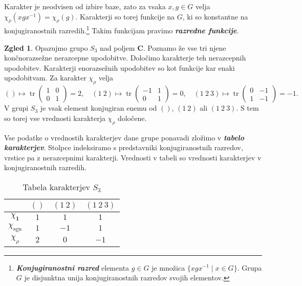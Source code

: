\documentclass[11pt]{book}
\def\CC{\mathbf{C}}
\def\11{\mathbf{1}}
\DeclareMathOperator\sgn{sgn}
\DeclareMathOperator\tr{tr}
\def\definicija{\color{rdeca}\bf\em}
\theoremstyle{definition}
\theoremstyle{zgled}
\newtheorem*{zgled}{Zgled}
\theoremstyle{odprtproblem}
\theoremstyle{domacanaloga}
\theoremstyle{izrek}
\begin{document}
Karakter je neodvisen od izbire baze, zato za vsaka $x, g \in G$ velja $\chi_{\rho}(x g x^{-1}) = \chi_{\rho}(g)$. Karakterji so torej funkcije na $G$, ki so konstantne na konjugiranostnih razredih.\footnote{{\definicija Konjugiranostni razred} elementa $g \in G$ je množica $\{ x g x^{-1} \mid x \in G \}$. Grupa $G$ je disjunktna unija konjugiranostnih razredov svojih elementov.} Takim funkcijam pravimo {\definicija razredne funkcije}.

\begin{zgled}
Opazujmo grupo $S_3$ nad poljem $\CC$. Poznamo že vse tri njene končnorazsežne nerazcepne upodobitve. Določimo karakterje teh nerazcepnih upodobitev. Karakterji enorazsežnih upodobitev so kot funkcije kar enaki upodobitvam. Za karakter $\chi_{\rho}$ velja
\[
    () \mapsto \tr \begin{pmatrix}
        1 & 0 \\ 0 & 1
    \end{pmatrix} = 2, \quad
    (1 \ 2) \mapsto \tr \begin{pmatrix}
        -1 & 1 \\ 0 & 1
    \end{pmatrix} = 0, \quad
    (1 \ 2 \ 3) \mapsto \tr \begin{pmatrix}
        0 & -1 \\ 1 & -1
    \end{pmatrix} = -1.
\]
V grupi $S_3$ je vsak element konjugiran enemu od $()$, $(1 \ 2)$ ali $(1 \ 2 \ 3)$. S tem so torej vse vrednosti karakterja $\chi_{\rho}$ določene.

Vse podatke o vrednostih karakterjev dane grupe ponavadi zložimo v {\definicija tabelo karakterjev}. Stolpce indeksiramo s predstavniki konjugiranostnih razredov, vrstice pa z nerazcepnimi karakterji. Vrednosti v tabeli so vrednosti karakterjev v konjugiranostnih razredih.

\begin{table}[h!]
     \centering
\begin{tabular}{c|ccc}
     & $()$ & $(1 \ 2)$ & $(1 \ 2 \ 3)$ \\ \hline
     $\chi_{\11}$ & $1$ & $1$ & $1$ \\
     $\chi_{\sgn}$ & $1$ & $-1$ & $1$ \\
     $\chi_{\rho}$ & $2$ & $0$ & $-1$ \\
\end{tabular}
\caption{Tabela karakterjev $S_3$}
\end{table}
\end{zgled}
\end{document}

